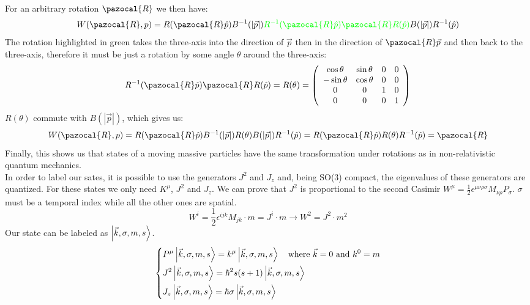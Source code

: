 \documentclass[../main.tex]{subfiles}
\begin{document}
For an arbitrary rotation $\pazocal{R}$ we then have:
\[
W(\pazocal{R},p)=R(\pazocal{R}\hat{p})B^{-1}(|\Vec{p}|){\color{green}R^{-1}(\pazocal{R}\hat{p})\pazocal{R}R(\hat{p})}B(|\Vec{p}|)R^{-1}(\hat{p})
\]
The rotation highlighted in green takes the three-axis into the direction of $\Vec{p}$ then in the direction of $\pazocal{R}\Vec{p}$ and then back to the three-axis, therefore it must be just a rotation by some angle $\theta$ around the three-axis:
\[
R^{-1}(\pazocal{R}\hat{p})\pazocal{R}R(\hat{p})=R(\theta)=\left(\begin{array}{cccc}
    \cos\theta & \sin\theta & 0 & 0 \\
    -\sin\theta & \cos\theta & 0 & 0 \\
    0 & 0 & 1 & 0 \\
    0 & 0 & 0 & 1
\end{array}\right)
\]
$R(\theta)$ commute with $B(|\Vec{p}|)$, which gives us:
\[
W(\pazocal{R},p)=R(\pazocal{R}\hat{p})B^{-1}(|\Vec{p}|)R(\theta)B(|\Vec{p}|)R^{-1}(\hat{p})=R(\pazocal{R}\hat{p})R(\theta)R^{-1}(\hat{p})=\pazocal{R}
\]
Finally, this shows us that states of a moving massive particles have the same transformation under rotations as in non-relativistic quantum mechanics.\\
In order to label our sates, it is possible to use the generators $J^2$ and $J_z$ and, being SO(3) compact, the eigenvalues of these generators are quantized. For these states we only need $K^\mu$, $J^2$ and $J_z$. We can prove that $J^2$ is proportional to the second Casimir $W^\mu=\frac{1}{2}\epsilon^{\mu\nu\rho\sigma}M_{\nu\rho}P_\sigma$. $\sigma$ must be a temporal index while all the other ones are spatial.
\[
W^i=\frac{1}{2}\epsilon^{ijk}M_{jk}\cdot m=J^i\cdot m\xrightarrow[]{}W^2=J^2\cdot m^2
\]
Our state can be labeled as $\ket{\Vec{k},\sigma,m,s}$.
\[
\left\{
\begin{aligned}
&P^\mu\ket{\Vec{k},\sigma,m,s}=k^\mu\ket{\Vec{k},\sigma,m,s} \quad \text{where $\Vec{k}=0$ and $k^0=m$}\\
&J^2\ket{\Vec{k},\sigma,m,s}=\hbar^2s(s+1)\ket{\Vec{k},\sigma,m,s}\\
&J_z\ket{\Vec{k},\sigma,m,s}=\hbar\sigma\ket{\Vec{k},\sigma,m,s}
\end{aligned}
\right.
\]
\end{document}
